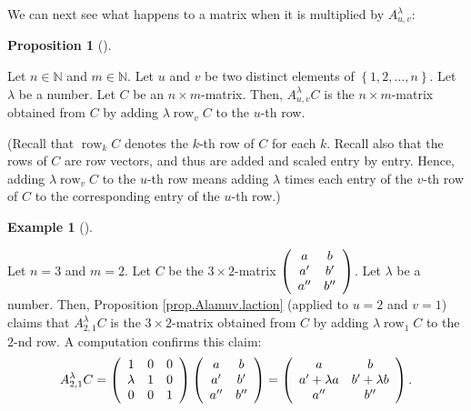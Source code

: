 \documentclass[numbers=enddot,12pt,final,onecolumn,notitlepage]{scrartcl}%
\theoremstyle{definition}
\newtheorem{prop}[theo]{Proposition}
\newenvironment{proposition}[1][]
{\begin{prop}[#1]\begin{leftbar}}
{\end{leftbar}\end{prop}}
\newtheorem{exam}[theo]{Example}
\newenvironment{example}[1][]
{\begin{exam}[#1]\begin{leftbar}}
{\end{leftbar}\end{exam}}
\begin{document}
We can next see what happens to a matrix when it is multiplied by
$A_{u,v}^{\lambda}$:

\begin{proposition}
\label{prop.Alamuv.laction}Let $n\in\mathbb{N}$ and $m\in\mathbb{N}$. Let $u$
and $v$ be two distinct elements of $\left\{  1,2,\ldots,n\right\}  $. Let
$\lambda$ be a number. Let $C$ be an $n\times m$-matrix. Then, $A_{u,v}%
^{\lambda}C$ is the $n\times m$-matrix obtained from $C$ by adding
$\lambda\operatorname*{row}\nolimits_{v}C$ to the $u$-th row.

(Recall that $\operatorname*{row}\nolimits_{k}C$ denotes the $k$-th row of $C$
for each $k$. Recall also that the rows of $C$ are row vectors, and thus are
added and scaled entry by entry. Hence, adding $\lambda\operatorname*{row}%
\nolimits_{v}C$ to the $u$-th row means adding $\lambda$ times each entry of
the $v$-th row of $C$ to the corresponding entry of the $u$-th row.)
\end{proposition}

\begin{example}
\label{exam.prop.Alamuv.laction}Let $n=3$ and $m=2$. Let $C$ be the $3\times
2$-matrix $\left(
\begin{array}
[c]{cc}%
a & b\\
a^{\prime} & b^{\prime}\\
a^{\prime\prime} & b^{\prime\prime}%
\end{array}
\right)  $. Let $\lambda$ be a number. Then, Proposition
\ref{prop.Alamuv.laction} (applied to $u=2$ and $v=1$) claims that
$A_{2,1}^{\lambda}C$ is the $3\times2$-matrix obtained from $C$ by adding
$\lambda\operatorname*{row}\nolimits_{1}C$ to the $2$-nd row. A computation
confirms this claim:%
\[
A_{2,1}^{\lambda}C=\left(
\begin{array}
[c]{ccc}%
1 & 0 & 0\\
\lambda & 1 & 0\\
0 & 0 & 1
\end{array}
\right)  \left(
\begin{array}
[c]{cc}%
a & b\\
a^{\prime} & b^{\prime}\\
a^{\prime\prime} & b^{\prime\prime}%
\end{array}
\right)  =\left(
\begin{array}
[c]{cc}%
a & b\\
a^{\prime}+\lambda a & b^{\prime}+\lambda b\\
a^{\prime\prime} & b^{\prime\prime}%
\end{array}
\right)  .
\]

\end{example}
\end{document}
